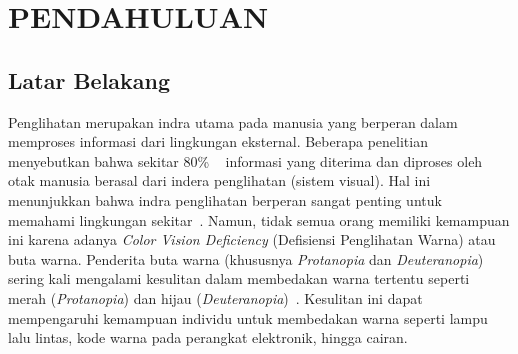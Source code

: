 
\chapter{PENDAHULUAN}


\section{Latar Belakang}

\setlength{\parindent}{2em} Penglihatan merupakan indra utama pada manusia yang berperan dalam memproses informasi dari lingkungan eksternal.
Beberapa penelitian menyebutkan bahwa sekitar 80\% ~\parencite{bci_biomedical} informasi yang diterima dan diproses oleh otak manusia berasal dari indera penglihatan (sistem visual).
Hal ini menunjukkan bahwa indra penglihatan berperan sangat penting untuk memahami lingkungan sekitar~\parencite{chung2020visual}.
Namun, tidak semua orang memiliki kemampuan ini karena adanya \textit{Color Vision Deficiency} (Defisiensi Penglihatan Warna) atau buta warna.
Penderita buta warna (khususnya \textit{Protanopia} dan \textit{Deuteranopia}) sering kali mengalami kesulitan dalam membedakan warna tertentu seperti merah (\textit{Protanopia}) dan hijau (\textit{Deuteranopia})~\parencite{improving_discrimination}.
Kesulitan ini dapat mempengaruhi kemampuan individu untuk membedakan warna seperti lampu lalu lintas, kode warna pada perangkat elektronik, hingga cairan.


